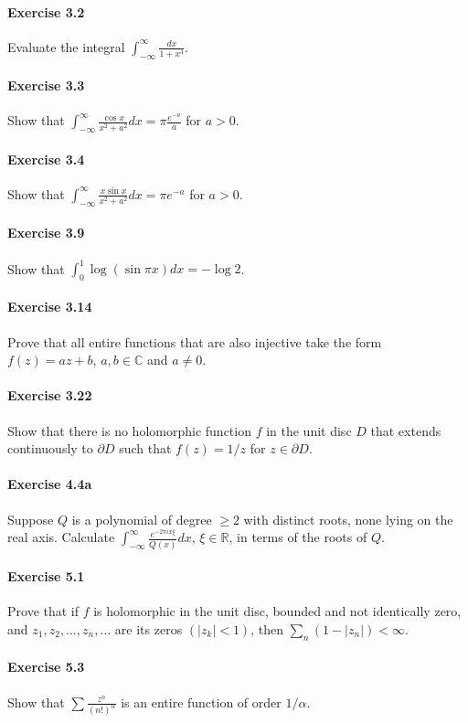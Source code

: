 \documentclass{article}
\begin{document}
\paragraph{Exercise 3.2} Evaluate the integral $\int_{-\infty}^{\infty} \frac{dx}{1 + x^4}$.

\paragraph{Exercise 3.3} Show that $ \int_{-\infty}^{\infty} \frac{\cos x}{x^2 + a^2} dx = \pi \frac{e^{-a}}{a}$ for $a > 0$.

\paragraph{Exercise 3.4} Show that $ \int_{-\infty}^{\infty} \frac{x \sin x}{x^2 + a^2} dx = \pi e^{-a}$ for $a > 0$.

\paragraph{Exercise 3.9} Show that $\int_0^1 \log(\sin \pi x) dx = - \log 2$.

\paragraph{Exercise 3.14} Prove that all entire functions that are also injective take the form $f(z) = az + b$, $a, b \in \mathbb{C}$ and $a \neq 0$.

\paragraph{Exercise 3.22} Show that there is no holomorphic function $f$ in the unit disc $D$ that extends continuously to $\partial D$ such that $f(z) = 1/z$ for $z \in \partial D$.

\paragraph{Exercise 4.4a} Suppose $Q$ is a polynomial of degree $\geq 2$ with distinct roots, none lying on the real axis. Calculate $\int_{-\infty}^\infty \frac{e^{-2 \pi ix \xi}}{Q(x)} dx$, $\xi \in \mathbb{R}$, in terms of the roots of $Q$.

\paragraph{Exercise 5.1} Prove that if $f$ is holomorphic in the unit disc, bounded and not identically zero, and $z_{1}, z_{2}, \ldots, z_{n}, \ldots$ are its zeros $\left(\left|z_{k}\right|<1\right)$, then $\sum_{n}\left(1-\left|z_{n}\right|\right)<\infty$.

\paragraph{Exercise 5.3} Show that $\sum \frac{z^{n}}{(n !)^{\alpha}}$ is an entire function of order $1 / \alpha$.
\end{document}
